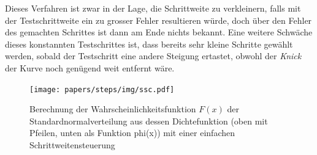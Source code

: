 Dieses Verfahren ist zwar in der Lage, die Schrittweite zu verkleinern, falls mit der Testschrittweite ein zu grosser Fehler resultieren würde,
doch über den Fehler des gemachten Schrittes ist dann am Ende nichts bekannt.
Eine weitere Schwäche dieses konstannten Testschrittes ist, dass bereits sehr kleine Schritte gewählt werden,
sobald der Testschritt eine andere Steigung ertastet, obwohl der \textit{Knick} der Kurve noch genügend weit entfernt wäre.

\begin{figure}
  \centering
  \texttt{[image: papers/steps/img/ssc.pdf]}
  \caption{Berechnung der Wahrscheinlichkeitsfunktion $F(x)$ der Standardnormalverteilung aus dessen Dichtefunktion
    (oben mit Pfeilen, unten als Funktion phi(x)) mit einer einfachen Schrittweitensteuerung
    \label{buch:steps:examplessc}}
\end{figure}

